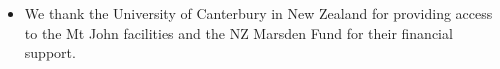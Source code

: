 \vspace{-1.75cm}
\begin{itemize}[itemsep=20pt]
\item[] We thank the University of Canterbury in New Zealand for providing
access to the Mt John facilities and the NZ Marsden Fund for their
financial support.
\end{itemize}
\vspace{-1.75cm}